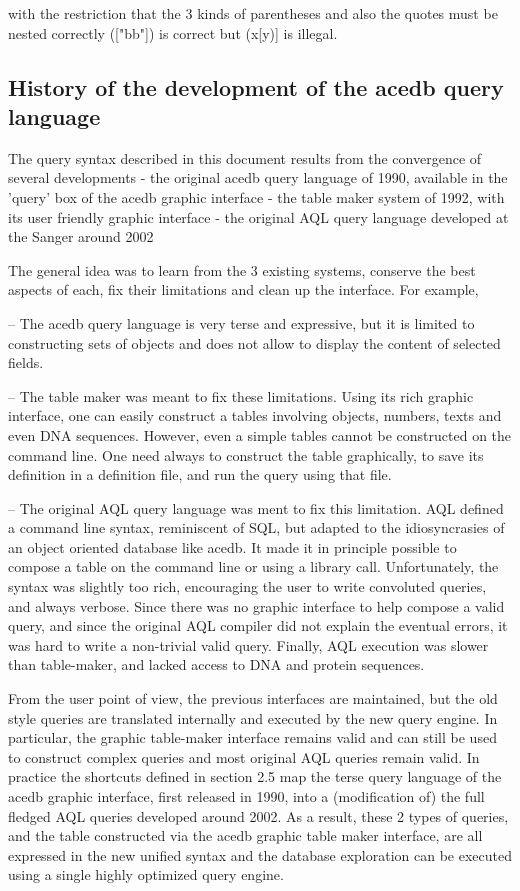 \documentclass[11pt]{article}
\begin{document}
with the restriction that the 3 kinds of parentheses and 
also the quotes must be nested correctly  (["bb"]) is correct but (x[y)] is illegal.

\subsection{History of the development of the acedb query language}

The query syntax described in this document results from the convergence of several developments
   - the original acedb query language of 1990, available in the 'query' box of the acedb graphic interface
   - the table maker system of 1992, with its user friendly graphic interface 
   - the original AQL query language developed at the Sanger around 2002

The general idea was to learn from the 3 existing systems, conserve the best aspects of each, fix their limitations and clean up the interface. For example, 

-- The acedb query language is very terse and expressive, but it is limited to constructing sets of objects and does not allow to display the content of selected fields.

-- The table maker was meant to fix these limitations. Using its rich graphic interface, one can easily construct a tables involving objects, numbers, texts and even DNA sequences. However, even a simple tables cannot be constructed on the command line. One need always to construct the table graphically, to save its definition in a definition file, and run the query using that file. 

-- The original AQL query language was ment to fix this limitation. AQL defined a command line syntax, reminiscent of SQL, but adapted to the idiosyncrasies of an object oriented database like acedb. It made it in principle possible to compose a table on the command line or using a library call. Unfortunately, the syntax was slightly too rich, encouraging the user to write convoluted queries, and always verbose. Since there was no graphic interface to help compose a valid query, and since the original AQL compiler did not explain the eventual errors, it was hard to write a non-trivial valid query. Finally, AQL execution was slower than table-maker, and lacked access to DNA and protein sequences. 

From the user point of view, the previous interfaces are maintained, but the old style queries are translated internally and executed by the new query engine. In particular, the graphic table-maker interface remains valid and can still be used to construct complex queries and most original AQL queries remain valid. In practice the shortcuts 
defined in section 2.5 map the terse query language of the acedb graphic interface, first released in 1990, into a (modification of) the full fledged 
AQL queries developed around 2002. As a result, these 2 types of queries, and the table constructed via the acedb graphic table 
maker interface, are all expressed in the new unified syntax and the database exploration can be executed using a single highly optimized query engine.
\end{document}
